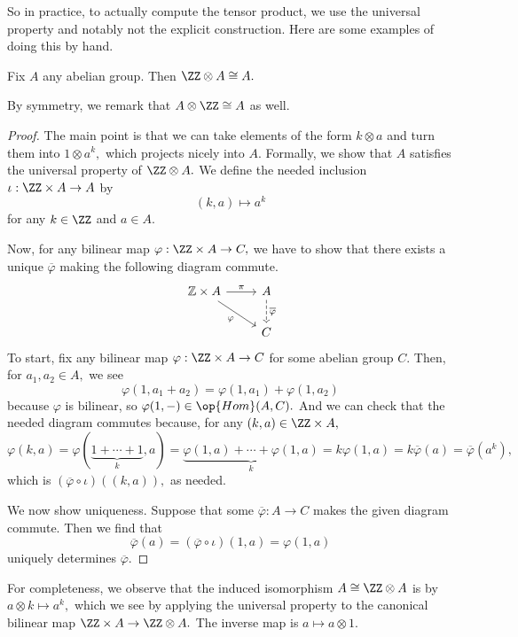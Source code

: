 \documentclass[../notes.tex]{subfiles}
\begin{document}
So in practice, to actually compute the tensor product, we use the universal property and notably not the explicit construction. Here are some examples of doing this by hand.
\begin{proposition}
	Fix $A$ any abelian group. Then $\ZZ\otimes A\cong A.$
\end{proposition}
By symmetry, we remark that $A\otimes\ZZ\cong A$ as well.
\begin{proof}
	The main point is that we can take elements of the form $k\otimes a$ and turn them into $1\otimes a^k,$ which projects nicely into $A.$ Formally, we show that $A$ satisfies the universal property of $\ZZ\otimes A.$ We define the needed inclusion $\iota:\ZZ\times A\to A$ by
	\[(k,a)\mapsto a^k\]
	for any $k\in\ZZ$ and $a\in A.$
	
	Now, for any bilinear map $\varphi:\ZZ\times A\to C,$ we have to show that there exists a unique $\overline\varphi$ making the following diagram commute.
	\[\begin{tikzcd}
		{\mathbb Z\times A} & A \\
		& C
		\arrow["\varphi"', from=1-1, to=2-2]
		\arrow["\overline\varphi", dashed, from=1-2, to=2-2]
		\arrow["\pi", from=1-1, to=1-2]
	\end{tikzcd}\]
	To start, fix any bilinear map $\varphi:\ZZ\times A\to C$ for some abelian group $C.$ Then, for $a_1,a_2\in A,$ we see
	\[\varphi(1,a_1+a_2)=\varphi(1,a_1)+\varphi(1,a_2)\]
	because $\varphi$ is bilinear, so $\varphi(1,-)\in\op{Hom}(A,C).$ And we can check that the needed diagram commutes because, for any $(k,a)\in\ZZ\times A,$
	\[\varphi(k,a)=\varphi(\underbrace{1+\cdots+1}_k,a)=\underbrace{\varphi(1,a)+\cdots+\varphi(1,a)}_k=k\varphi(1,a)=k\overline\varphi(a)=\overline\varphi\left(a^k\right),\]
	which is $(\overline\varphi\circ\iota)((k,a)),$ as needed.

	We now show uniqueness. Suppose that some $\overline\varphi:A\to C$ makes the given diagram commute. Then we find that
	\[\overline\varphi(a)=(\overline\varphi\circ\iota)(1,a)=\varphi(1,a)\]
	uniquely determines $\overline\varphi.$
\end{proof}
For completeness, we observe that the induced isomorphism $A\cong\ZZ\otimes A$ is by $a\otimes k\mapsto a^k,$ which we see by applying the universal property to the canonical bilinear map $\ZZ\times A\to\ZZ\otimes A.$ The inverse map is $a\mapsto a\otimes1.$
\end{document}
